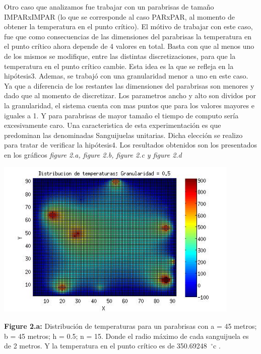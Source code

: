 
Otro caso que analizamos fue trabajar con un parabrisas de tamaño IMPARxIMPAR (lo que se corresponde al caso PARxPAR, al momento de obtener la temperatura en el punto crítico). El mótivo de trabajar con este caso, fue que como consecuencias de las dimensiones del parabrisas la temperatura en el punto crítico ahora depende de 4 valores en total. Basta con que al menos uno de los mismos se modifique, entre las distintas discretizaciones, para que la temperatura en el punto crítico cambie. Esta idea es la que se refleja en la hipótesis3.\newline
Ademas, se trabajó con una granularidad menor a uno en este caso. Ya que a diferencia de los restantes las dimensiones del parabrisas son menores y dado que al momento de discretizar. Los parametros ancho y alto son dividos por la granularidad, el sistema cuenta con mas puntos que para los valores mayores e iguales a 1. Y para parabrisas de mayor tamaño el tiempo de computo sería excesivamente caro.  
Una caracteristica de esta experimentación es que predominan las denominadas Sanguijuelas unitarias. Dicha elección se realizo para tratar de verificar la hipótesis4. Los resultados obtenidos son los presentados en los gráficos \textit{figure 2.a, figure 2.b, figure 2.c y figure 2.d}\newline


\includegraphics[width=\textwidth,height=3.0in,keepaspectratio
]{45x45h0,5.jpg} \newline
\begin {flushleft}
\textbf{Figure 2.a:} Distribución de temperaturas para un parabrisas con a = 45 metros; b = 45 metros; h = 0.5; n = 15. Donde el radio máximo de cada sanguijuela es de 2 metros. Y la temperatura en el punto crítico es de  350.69248\hspace{-1.5mm}$\phantom{a}^{\circ}$c .
\end{flushleft}

